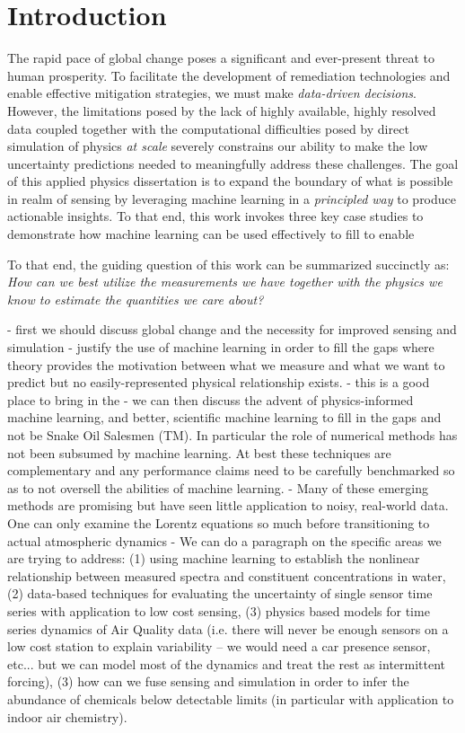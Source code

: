 \chapter{Introduction}


The rapid pace of global change poses a significant and ever-present threat to human prosperity. To facilitate the development of remediation technologies and enable effective mitigation strategies, we must make \textit{data-driven decisions}. However, the limitations posed by the lack of highly available, highly resolved data coupled together with the computational difficulties posed by direct simulation of physics \textit{at scale} severely constrains our ability to make the low uncertainty predictions needed to meaningfully address these challenges. The goal of this applied physics dissertation is to expand the boundary of what is possible in realm of sensing by leveraging machine learning in a \textit{principled way} to produce actionable insights. To that end, this work invokes three key case studies to demonstrate how machine learning can be used effectively to fill to enable


To that end, the guiding question of this work can be summarized succinctly as: \textit{How can we best utilize the measurements we have together with the physics we know to estimate the quantities we care about?}




- first we should discuss global change and the necessity for improved sensing and simulation
- justify the use of machine learning in order to fill the gaps where theory provides the motivation between what we measure and what we want to predict but no easily-represented physical relationship exists.
- this is a good place to bring in the
- we can then discuss the advent of physics-informed machine learning, and better, scientific machine learning to fill in the gaps and not be Snake Oil Salesmen (TM). In particular the role of numerical methods has not been subsumed by machine learning. At best these techniques are complementary and any performance claims need to be carefully benchmarked so as to not oversell the abilities of machine learning.
- Many of these emerging methods are promising but have seen little application to noisy, real-world data. One can only examine the Lorentz equations so much before transitioning to actual atmospheric dynamics
- We can do a paragraph on the specific areas we are trying to address: (1) using machine learning to establish the nonlinear relationship between measured spectra and constituent concentrations in water, (2) data-based techniques for evaluating the uncertainty of single sensor time series with application to low cost sensing, (3) physics based models for time series dynamics of Air Quality data (i.e. there will never be enough sensors on a low cost station to explain variability -- we would need a car presence sensor, etc... but we can model most of the dynamics and treat the rest as intermittent forcing), (3) how can we fuse sensing and simulation in order to infer the abundance of chemicals below detectable limits (in particular with application to indoor air chemistry).




